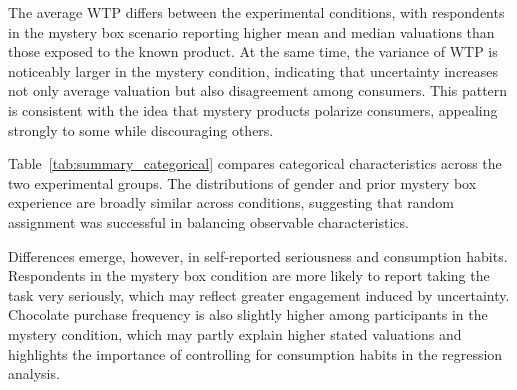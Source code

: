 \documentclass{article}
\begin{document}
The average WTP differs between the experimental conditions, with respondents in the mystery box scenario reporting higher mean and median valuations than those exposed to the known product. At the same time, the variance of WTP is noticeably larger in the mystery condition, indicating that uncertainty increases not only average valuation but also disagreement among consumers. This pattern is consistent with the idea that mystery products polarize consumers, appealing strongly to some while discouraging others.

\begin{table}[H]
\centering
\caption{Summary statistics by condition (numeric variables)}
\label{tab:summary_numeric}

\end{table}


Table~\ref{tab:summary_categorical} compares categorical characteristics across the two experimental groups. The distributions of gender and prior mystery box experience are broadly similar across conditions, suggesting that random assignment was successful in balancing observable characteristics.

Differences emerge, however, in self-reported seriousness and consumption habits. Respondents in the mystery box condition are more likely to report taking the task very seriously, which may reflect greater engagement induced by uncertainty. Chocolate purchase frequency is also slightly higher among participants in the mystery condition, which may partly explain higher stated valuations and highlights the importance of controlling for consumption habits in the regression analysis.
\end{document}
